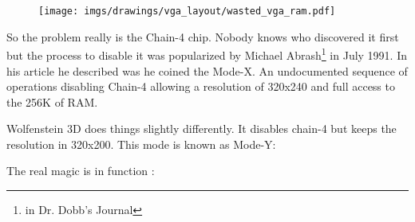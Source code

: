 \documentclass[book.tex]{subfiles}
\begin{document}
\begin{figure}[H]
\centering
 \texttt{[image: imgs/drawings/vga\_layout/wasted\_vga\_ram.pdf]}
 \end{figure}

 \par
 So the problem really is the Chain-4 chip. Nobody knows who discovered it first but the process to disable it was popularized by Michael Abrash\footnote{in Dr. Dobb's Journal} in July 1991. In his article he described was he coined the Mode-X. An undocumented sequence of operations disabling Chain-4 allowing a resolution of 320x240 and full access to the 256K of RAM.\\
 \par
 Wolfenstein 3D does things slightly differently. It disables chain-4 but keeps the resolution in 320x200. This mode is known as Mode-Y:\\
 \par
  \begin{minipage}{\textwidth}

\end{minipage}
 \par

The real magic is in function :\\
\end{document}
